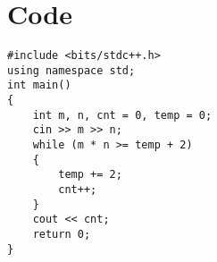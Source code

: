 \documentclass{article}
\begin{document}
\newpage
\section{Code}

\begin{lstlisting}
#include <bits/stdc++.h>
using namespace std;
int main()
{
    int m, n, cnt = 0, temp = 0;
    cin >> m >> n;
    while (m * n >= temp + 2)
    {
        temp += 2;
        cnt++;
    }
    cout << cnt;
    return 0;
}

\end{lstlisting}
\end{document}
